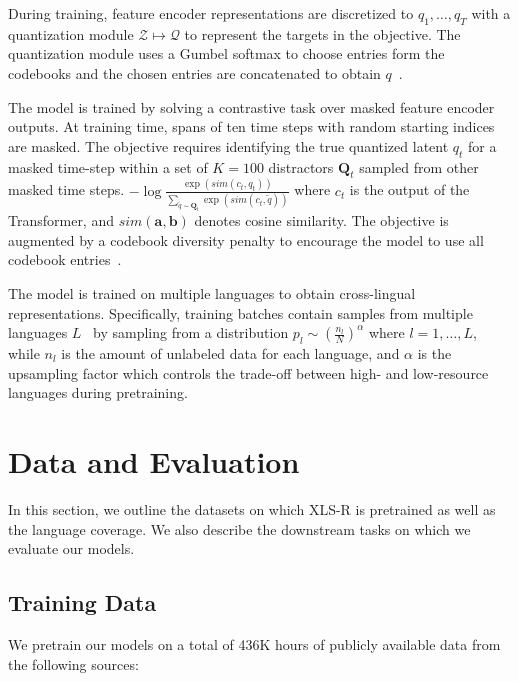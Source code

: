\documentclass{article} \usepackage{iclr2022_conference,times}
\newcommand{\xlsrp}{XLS-R}
\newcommand{\Feat}{\mathcal{Z}}
\newcommand{\QFeat}{\mathcal{Q}}
\newcommand{\zq}{q}
\newcommand{\zqt}{\tilde{q}}
\newcommand{\cc}{c}
\begin{document}
During training, feature encoder representations are discretized to $\zq_1, \dots, \zq_T$ with a quantization module $\Feat \mapsto \QFeat$ to represent the targets in the objective.
The quantization module uses a Gumbel softmax to choose entries form the codebooks and the chosen entries are concatenated to obtain $\zq$~\citep{jegou2011ieee,jang2016gumbel,baevski2019vqwav2vec}.

The model is trained by solving a contrastive task over masked feature encoder outputs.
At training time, spans of ten time steps with random starting indices are masked.
The objective requires identifying the true quantized latent $\zq_t$ for a masked time-step within a set of $K=100$ distractors $\mathbf{Q}_t$ sampled from other masked time steps.
$-\log \frac{\exp(sim(\cc_t, \zq_t))}{\sum_{\zqt \sim \mathbf{Q}_t} \exp(sim(\cc_t, \zqt))}$
where $\cc_t$ is the output of the Transformer, and $sim(\mathbf{a}, \mathbf{b})$ denotes cosine similarity.
The objective is augmented by a codebook diversity penalty to encourage the model to use all codebook entries~\citep{dieleman2018challenge}.




The model is trained on multiple languages to obtain cross-lingual representations.
Specifically, training batches contain samples from multiple languages $L$~\citep{devlin2018bert,lample2019xlm,conneau2021xlsr} by sampling from a distribution $p_l\sim\left(\frac{n_l}{N}\right)^{\alpha}$ where $l=1,\ldots,L$, while $n_l$ is the amount of unlabeled data for each language, and $\alpha$ is the upsampling factor which controls the trade-off between high- and low-resource languages during pretraining.


\section{Data and Evaluation}
In this section, we outline the datasets on which \xlsrp{} is pretrained as well as the language coverage. We also describe the downstream tasks on which we evaluate our models.

\subsection{Training Data}
\label{sec:traindata}
We pretrain our models on a total of 436K hours of publicly available data from the following sources:
\end{document}
